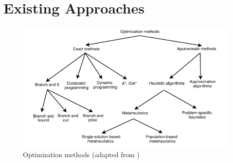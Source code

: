 \section{Existing Approaches}
\label{section:existingappr}
\begin{figure}[h!]
 \centering
   \includegraphics{./images/typesOfAlgorithms}
   \caption{Optimization methods (adapted from \cite{Talbi2009})}
   \label{fig:TypesAlgorithms}
\end{figure}

